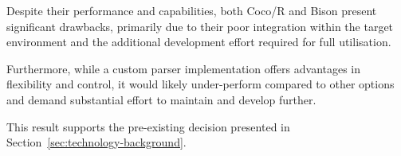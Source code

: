Despite their performance and capabilities, both Coco/R and Bison present significant drawbacks, primarily due to their poor integration within the target environment and the additional development effort required for full utilisation. 

Furthermore, while a custom parser implementation offers advantages in flexibility and control, it would likely under-perform compared to other options and demand substantial effort to maintain and develop further.

This result supports the pre-existing decision presented in Section~\ref{sec:technology-background}.

